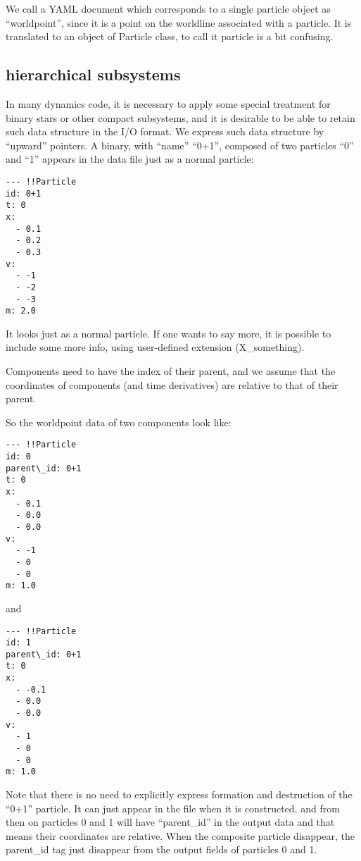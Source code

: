 \documentclass[12pt]{article}
\begin{document}
We call a YAML document which corresponds to a single particle object
as ``worldpoint'', since it is a point on the worldline associated
with a particle. It is translated to an object of Particle class, to
call it particle is a bit confusing.

\subsection{hierarchical subsystems}

In many dynamics code, it is necessary to apply some special treatment
for binary stars or other compact subsystems, and it is desirable to
be able to  retain such data structure in the I/O format. We express
such data structure by ``upward'' pointers. A binary, with ``name''
``0+1'', composed of two particles ``0'' and ``1'' appears in the data
file just as a normal particle:


\begin{verbatim}
--- !!Particle
id: 0+1
t: 0
x:
  - 0.1
  - 0.2
  - 0.3
v:
  - -1
  - -2
  - -3
m: 2.0
\end{verbatim}

It looks just as a normal particle. If one wants to say more, it is
possible to include some more info, using user-defined extension
(X\_something).

Components need to have the index of their parent, and we assume that
the coordinates of components (and time derivatives) are relative to
that of their parent.

So the worldpoint data of two components look like:

\begin{verbatim}
--- !!Particle
id: 0
parent\_id: 0+1
t: 0
x:
  - 0.1
  - 0.0
  - 0.0
v:
  - -1
  - 0
  - 0
m: 1.0
\end{verbatim}

and

\begin{verbatim}
--- !!Particle
id: 1
parent\_id: 0+1
t: 0
x:
  - -0.1
  - 0.0
  - 0.0
v:
  - 1
  - 0
  - 0
m: 1.0
\end{verbatim}


Note that there is no need to explicitly express formation and
destruction of the  ``0+1'' particle. It can just appear in the file
when it is constructed, and from then on particles 0 and 1 will have
``parent\_id'' in the output data and that means their coordinates are
relative. When the composite particle disappear, the parent\_id tag
just disappear from the output fields of particles 0 and 1.
\end{document}
